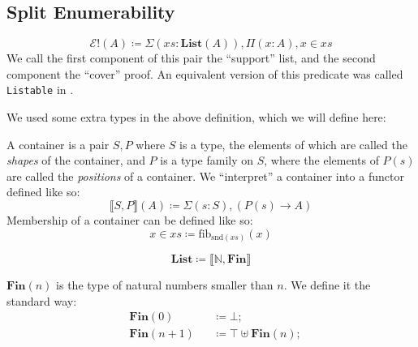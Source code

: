 \subsection{Split Enumerability}
\begin{definition} \label{split-enum-def}
  \begin{equation} \label{split-enum-def-eqn}
    \mathcal{E}!(A) \coloneqq \Sigma {(\mathit{xs} : \textbf{List}(A))} , \Pi {(x : A)} , x \in \mathit{xs}
  \end{equation}
  We call the first component of this pair the ``support'' list, and the second
  component the ``cover'' proof.
  An equivalent version of this predicate was called \verb+Listable+ in
  \cite{firsovDependentlyTypedProgramming2015}.
\end{definition}

We used some extra types in the above definition, which we will define here:
\begin{definition}[Containers] \label{container-def}
  A container \cite{abbottContainersConstructingStrictly2005} is a pair
  \(S , P\) where \(S\) is a type, the elements of which are called
  the \emph{shapes} of the container, and \(P\) is a type family on \(S\), where
  the elements of \(P(s)\) are called the \emph{positions} of a container.
  We ``interpret'' a container into a functor defined like so:
  \begin{equation} \label{container-interp}
    \llbracket S , P \rrbracket(A) \coloneqq \Sigma {(s : S)} , \left( P(s) \rightarrow A \right)
  \end{equation}
  Membership of a container can be defined like so:
  \begin{equation} \label{container-membership}
    x \in \mathit{xs} \coloneqq \text{fib}_{\text{snd}(\mathit{xs})}(x)
  \end{equation}
\end{definition}
\begin{definition} \label{List}
  \begin{equation}
    \mathbf{List} \coloneqq \llbracket \mathbb{N} , \mathbf{Fin} \rrbracket
  \end{equation}
\end{definition}
\begin{definition} \label{Fin}
  \(\mathbf{Fin}(n)\) is the type of natural numbers smaller than \(n\). We
  define it the standard way:
  \begin{equation}
    \begin{alignedat}{3}
      & \mathbf{Fin}(0)     && \coloneqq \bot ; \\
      & \mathbf{Fin}(n + 1) && \coloneqq \top \uplus \mathbf{Fin}(n) ;
    \end{alignedat}
  \end{equation} 
\end{definition}


